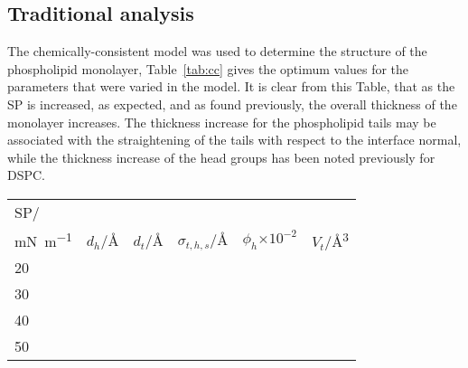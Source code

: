 \subsection{Traditional analysis}
The chemically-consistent model was used to determine the structure of the phospholipid monolayer, Table~\ref{tab:cc} gives the optimum values for the parameters that were varied in the model.
It is clear from this Table, that as the SP is increased, as expected, and as found previously, the overall thickness of the monolayer increases.
The thickness increase for the phospholipid tails may be associated with the straightening of the tails with respect to the interface normal, while the thickness increase of the head groups has been noted previously for DSPC.
%
\begin{sidewaystable}
\small
  \caption{\ The values for the parameters allowed to vary in the fitting of the chemically-consistent model, at each SP measured.}
  \label{tab:cc}
  \begin{tabular}{llllll}
    \toprule
    SP/ & & & & & \\
    \si{\milli\newton\per\meter} & $d_h$/\si{\angstrom} & $d_t$/\si{\angstrom} & $\sigma_{t,h,s}$/\si{\angstrom} & $\phi_h$$\times10^{-2}$ & $V_t$/\si{\angstrom\cubed} \\
    \midrule
    20 &  &  &  &  &  \\
    30 &  &  &  &  &  \\
    40 &  &  &  &  &  \\
    50 &  &  &  &  &  \\
    \bottomrule
  \end{tabular}
\end{sidewaystable}
%

